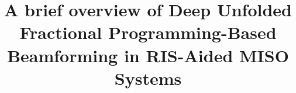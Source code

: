 \documentclass[lettersize,journal]{IEEEtran}
\begin{document}
\title{A brief overview of Deep Unfolded Fractional Programming-Based Beamforming
in RIS-Aided MISO Systems}

\author{
}
%
{}

\maketitle

%
%






\end{document}
